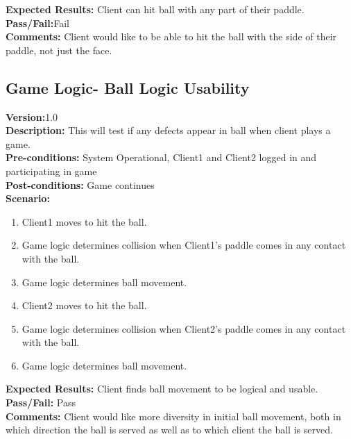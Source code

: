 \documentclass[12pt]{article}
\begin{document}
\textbf{Expected Results:} Client can hit ball with any part of their paddle.\\
\textbf{Pass/Fail:}Fail\\
\textbf{Comments:} Client would like to be able to hit the ball with the side of their paddle, not just the face.\\


\subsection{Game Logic- Ball Logic Usability}
\textbf{Version:}1.0\\
\textbf{Description:} This will test if any defects appear in ball when client plays a game.\\
\textbf{Pre-conditions:} System Operational, Client1 and Client2 logged in and participating in game \\
\textbf{Post-conditions:} Game continues\\
\textbf{Scenario:}
\begin{enumerate}
\item Client1 moves to hit the ball.\\
\item Game logic determines collision when Client1's paddle comes in any contact with the ball. \\
\item Game logic determines ball movement.\\
\item Client2 moves to hit the ball.\\
\item Game logic determines collision when Client2's paddle comes in any contact with the ball. \\
\item Game logic determines ball movement.\\
\end{enumerate}
\textbf{Expected Results:} Client finds ball movement to be logical and usable.\\
\textbf{Pass/Fail:} Pass\\
\textbf{Comments:} Client would like more diversity in initial ball movement, both in which direction the ball is served as well as to which client the ball is served.\\
\end{document}
